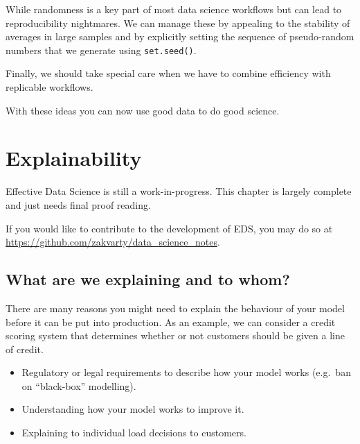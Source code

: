 \documentclass[
  letterpaper,
  DIV=11,
  numbers=noendperiod]{scrreprt}
\providecommand{\tightlist}{%
  \setlength{\itemsep}{0pt}\setlength{\parskip}{0pt}}\usepackage{longtable,booktabs,array}
\begin{document}
While randomness is a key part of most data science workflows but can
lead to reproducibility nightmares. We can manage these by appealing to
the stability of averages in large samples and by explicitly setting the
sequence of pseudo-random numbers that we generate using
\texttt{set.seed()}.

Finally, we should take special care when we have to combine efficiency
with replicable workflows.

With these ideas you can now use good data to do good science.

\chapter{Explainability}\label{production-explainability}

\begin{tcolorbox}[enhanced jigsaw, leftrule=.75mm, bottomtitle=1mm, toprule=.15mm, colbacktitle=quarto-callout-note-color!10!white, breakable, colback=white, bottomrule=.15mm, opacityback=0, colframe=quarto-callout-note-color-frame, title=\textcolor{quarto-callout-note-color}{\faInfo}\hspace{0.5em}{Note}, titlerule=0mm, toptitle=1mm, opacitybacktitle=0.6, arc=.35mm, rightrule=.15mm, coltitle=black, left=2mm]

Effective Data Science is still a work-in-progress. This chapter is
largely complete and just needs final proof reading.

If you would like to contribute to the development of EDS, you may do so
at \url{https://github.com/zakvarty/data_science_notes}.

\end{tcolorbox}

\section{What are we explaining and to
whom?}\label{what-are-we-explaining-and-to-whom}

There are many reasons you might need to explain the behaviour of your
model before it can be put into production. As an example, we can
consider a credit scoring system that determines whether or not
customers should be given a line of credit.

\begin{itemize}
\tightlist
\item
  Regulatory or legal requirements to describe how your model works
  (e.g.~ban on ``black-box'' modelling).
\item
  Understanding how your model works to improve it.
\item
  Explaining to individual load decisions to customers.
\end{itemize}
\end{document}
